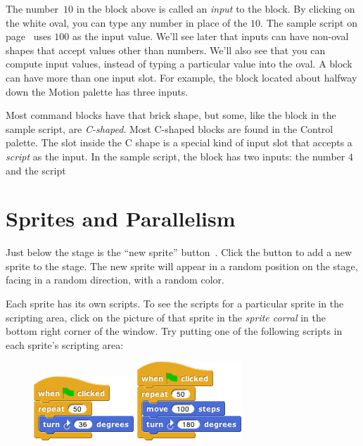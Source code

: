\documentclass{report}
\begin{document}
The number~$10$ in the  block above is called an \emph{input} to the block. By clicking on the white oval, you can type any number in place of the $10$. The sample script on page~\pageref{fig:typical-script} uses $100$ as the input value. We'll see later that inputs can have non-oval shapes that accept values other than numbers. We'll also see that you can compute input values, instead of typing a particular value into the oval. A block can have more than one input slot. For example, the  block located about halfway down the Motion palette has three inputs.

Most command blocks have that brick shape, but some, like the  block in the sample script, are \emph{C-shaped}. Most C-shaped blocks are found in the Control palette. The slot inside the C shape is a special kind of input slot that accepts a \emph{script} as the input. In the sample script, the  block has two inputs: the number $4$ and the script\nopagebreak


\section{Sprites and Parallelism}

Just below the stage is the ``new sprite'' button~. Click the button to add a new sprite to the stage. The new sprite will appear in a random position on the stage, facing in a random direction, with a random color.

Each sprite has its own scripts. To see the scripts for a particular sprite in the scripting area, click on the picture of that sprite in the \emph{sprite corral} in the bottom right corner of the window. Try putting one of the following scripts in each sprite's scripting area:\nopagebreak

\begin{figure}[H]
\begin{minipage}{0.5\textwidth}
\centering
\includegraphics[scale=\defaultGraphicsScale]{sprites-and-parallelism-1}
\end{minipage}%
\begin{minipage}{0.5\textwidth}
\centering
\includegraphics[scale=\defaultGraphicsScale]{sprites-and-parallelism-2}
\end{minipage}
\end{figure}
\end{document}
